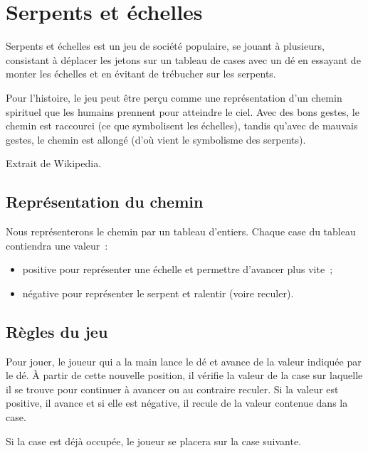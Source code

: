 	\section{Serpents et échelles}

		Serpents et échelles est un jeu de société
		populaire, se jouant à plusieurs, consistant à déplacer les jetons sur un
		tableau de cases avec un dé en essayant de monter les échelles et en évitant
		de trébucher sur les serpents.	
	
		Pour l'histoire, le jeu peut être perçu comme une représentation d'un chemin
		spirituel que les humains prennent pour atteindre le ciel. Avec des bons
		gestes, le chemin est raccourci (ce que symbolisent les échelles), tandis
		qu'avec de mauvais gestes, le chemin est allongé (d'où vient le symbolisme des
		serpents).
		\begin{flushright}
			Extrait de Wikipedia.		
		\end{flushright}
		
		\subsection*{Représentation du chemin}
		
			Nous représenterons le chemin par un tableau d'entiers. 
			Chaque case du tableau contiendra une valeur~:
			\begin{itemize}
				\item positive pour représenter une échelle et permettre d'avancer plus vite~;
				\item négative pour représenter le serpent et ralentir (voire reculer).
			\end{itemize}
	
		\subsection*{Règles du jeu}
		
			Pour jouer, le joueur qui a la main lance le dé et avance de la valeur
			indiquée par le dé. À partir de cette nouvelle position, il vérifie la
			valeur de la case sur laquelle il se trouve pour continuer à avancer ou au
			contraire reculer. Si la valeur est positive, il avance et si elle est
			négative, il recule de la valeur contenue dans la case.
		
			Si la case est déjà occupée, le joueur se placera sur la case suivante. 
		
